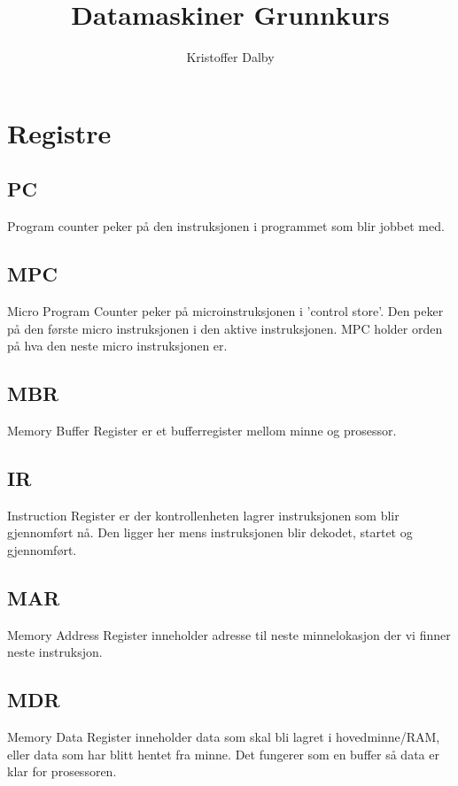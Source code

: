 \documentclass[a4paper, 10pt]{article}
\title{Datamaskiner Grunnkurs}
\author{Kristoffer Dalby}
\date{}
\begin{document}
\maketitle

\thispagestyle{empty}
\newpage
{}
\setcounter{page}{1}

\section{Registre}
\subsection{PC}
Program counter peker på den instruksjonen i programmet som blir jobbet med.

\subsection{MPC}
Micro Program Counter peker på microinstruksjonen i 'control store'.  Den peker på den første micro instruksjonen i den aktive instruksjonen. MPC holder orden på hva den neste micro instruksjonen er.

\subsection{MBR}
Memory Buffer Register er et bufferregister mellom minne og prosessor.

\subsection{IR}
Instruction Register er der kontrollenheten lagrer instruksjonen som blir gjennomført nå. Den ligger her mens instruksjonen blir dekodet, startet og gjennomført.

\subsection{MAR}
Memory Address Register inneholder adresse til neste minnelokasjon der vi finner neste instruksjon.

\subsection{MDR}
Memory Data Register inneholder data som skal bli lagret i hovedminne/RAM, eller data som har blitt hentet fra minne. Det fungerer som en buffer så data er klar for prosessoren.
\end{document}
